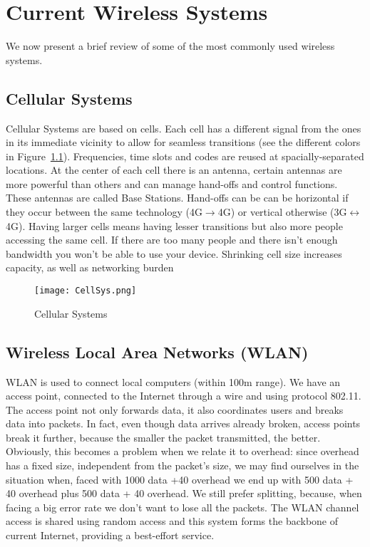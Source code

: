 \chapter{Current Wireless Systems}
We now present a brief review of some of the most commonly used wireless 
systems.

\section{Cellular Systems}
Cellular Systems are based on cells. Each cell has a different signal 
from the ones in its immediate vicinity to allow for seamless transitions (see 
the different colors in Figure~\ref{fig:cws:CellSys}). Frequencies, time 
slots and codes are reused at spacially-separated locations. At the center of 
each cell there is an antenna, certain antennas are more powerful than others 
and can manage hand-offs and control functions. These antennas are called Base 
Stations. Hand-offs can be can be horizontal if they occur between the same 
technology (4G$\to$4G) or vertical otherwise 
(3G$\leftrightarrow$4G).
Having larger cells means having lesser transitions but also more people 
accessing the same cell. If there are too many people and there isn't enough 
bandwidth you won't be able to use your device. Shrinking cell size increases 
capacity, as well as networking burden
\begin{figure}[!h]
  \centering
  \texttt{[image: CellSys.png]}
  \caption{Cellular Systems}				
  \label{fig:cws:CellSys}
\end{figure}

\section{Wireless Local Area Networks (WLAN)}
WLAN is used to connect local computers (within 100m range). We have an 
access point, connected to the Internet through a wire and using protocol 
802.11. The access point not only forwards data, it also coordinates users and 
breaks data into packets. In fact, even though data arrives already broken, 
access points break it further, because the smaller the packet transmitted, the 
better. Obviously, this becomes a problem when we relate it to overhead: since 
overhead has a fixed size, independent from the packet's size, we may find 
ourselves in the situation when, faced with 1000 data +40 overhead we end up 
with 500 data + 40 overhead plus 500 data + 40 overhead.
We still prefer splitting, because, when facing a big error rate we 
don't want to lose all the packets.
The WLAN channel access is shared using random access and this system 
forms the backbone of current Internet, providing a best-effort service.

